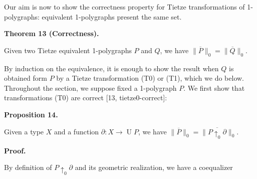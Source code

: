 \documentclass[10pt,a4paper]{amsart}
\begin{document}
 
Our aim is now to show the correctness property for Tietze transformations of 1-polygraphs: equivalent 1-polygraphs present the same set.\par
 
 
 
\par\medskip\noindent\textbf{Theorem 13 (Correctness).}\par
 
 
Given two Tietze equivalent 1-polygraphs $P$ and $Q$, we have $\|\overline{P}\|_{0}=\|\overline{Q}\|_{0}$.\par
 
 
 
 
By induction on the equivalence, it is enough to show the result when $Q$ is obtained form $P$ by a Tietze transformation (T0) or (T1), which we do below. Throughout the section, we suppose fixed a 1-polygraph $P$. We first show that transformations (T0) are correct [13, tietze0-correct]:\par
 
 
 
\par\medskip\noindent\textbf{Proposition 14.}\par
 
 
Given a type $X$ and a function $\partial:X\to\operatorname{U}P$, we have $\|\overline{P}\|_{0}=\|\overline{P{\uparrow_{0}}\partial}\|_{0}$.\par
 
 
 
 
\par\medskip\noindent\textbf{Proof.}\par
 
 
By definition of $P{\uparrow_{0}}\partial$ and its geometric realization, we have a coequalizer\par
    
\end{document}
